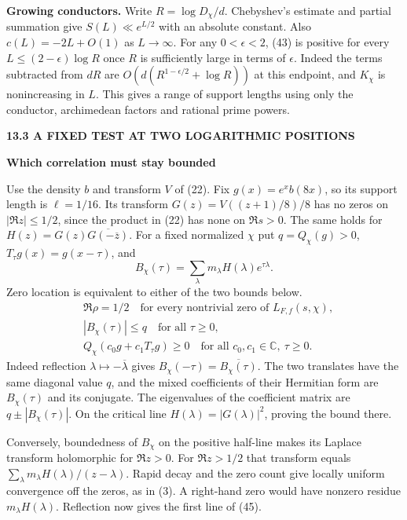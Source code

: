 \documentclass[11pt,letterpaper]{article}
\newcommand{\rightmarktext}{}
\newcommand{\printfolio}{}
\newcommand{\leaf}[4]{\clearpage\gdef\printfolio{#1}\gdef\rightmarktext{#2}%
  {\small\sffamily\bfseries\color{ink}#3\par}\vspace{3pt}%
  {\LARGE\bfseries #4\par}\vspace{5pt}}
\newcommand{\point}[1]{\par\smallskip\textbf{#1.}\enspace\ignorespaces}
\newcommand{\C}{\mathbb C}
\begin{document}
\point{Growing conductors} Write $R=\log D_\chi/d$. Chebyshev's
estimate and partial summation give $S(L)\ll e^{L/2}$ with an absolute
constant. Also $c(L)=-2L+O(1)$ as $L\to\infty$. For any
$0<\epsilon<2$, (43) is positive for every
$L\le(2-\epsilon)\log R$ once $R$ is sufficiently large in terms
of $\epsilon$. Indeed the terms subtracted from $dR$ are
$O(d(R^{1-\epsilon/2}+\log R))$ at this endpoint, and $K_\chi$ is
nonincreasing in $L$. This gives a range of support lengths using
only the conductor, archimedean factors and rational prime powers.

\leaf{522y}{Two translates}{13.3 \quad A FIXED TEST AT TWO LOGARITHMIC POSITIONS}{Which correlation must stay bounded}
Use the density $b$ and transform $V$ of (22). Fix $g(x)=e^x b(8x)$,
so its support length is $\ell=1/16$. Its transform
$G(z)=V((z+1)/8)/8$ has no zeros on $|\Re z|\le1/2$, since the
product in (22) has none on $\Re s>0$. The same holds for
$H(z)=G(z)\overline{G(-\overline z)}$. For a fixed normalized $\chi$
put $q=Q_\chi(g)>0$, $T_\tau g(x)=g(x-\tau)$, and
\[
 B_\chi(\tau)=\sum_\lambda m_\lambda H(\lambda)e^{\tau\lambda}.
\]
Zero location is equivalent to either of the two bounds below.
\begin{align*}
 &\Re\rho=1/2\quad\text{for every nontrivial zero of }L_{F,f}(s,\chi),\\
 &|B_\chi(\tau)|\le q\quad\text{for all }\tau\ge0,\\
 &Q_\chi(c_0g+c_1T_\tau g)\ge0
             \quad\text{for all }c_0,c_1\in\C,\ \tau\ge0 .
 \tag{45}
\end{align*}
Indeed reflection $\lambda\mapsto-\overline\lambda$ gives
$B_\chi(-\tau)=\overline{B_\chi(\tau)}$. The two translates have
the same diagonal value $q$, and the mixed coefficients of their
Hermitian form are $B_\chi(\tau)$ and its conjugate. The eigenvalues
of the coefficient matrix are $q\pm|B_\chi(\tau)|$. On the critical
line $H(\lambda)=|G(\lambda)|^2$, proving the bound there.

Conversely, boundedness of $B_\chi$ on the positive half-line makes
its Laplace transform holomorphic for $\Re z>0$. For $\Re z>1/2$
that transform equals $\sum_\lambda m_\lambda H(\lambda)/(z-\lambda)$.
Rapid decay and the zero count give locally uniform convergence off
the zeros, as in (3). A right-hand zero would have nonzero residue
$m_\lambda H(\lambda)$. Reflection now gives the first line of (45).
\end{document}
